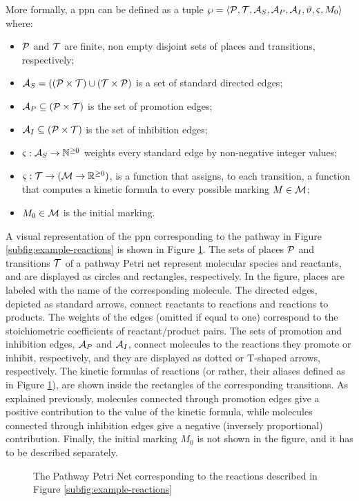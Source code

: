 More formally, a \gls{ppn} can be defined as a tuple $\wp = \Tuple{\Cal{P},\Cal{T},\Cal{A}_{S}, \Cal{A}_{P},\Cal{A}_{I},\vartheta,\varsigma,M_0}$ where:
\begin{itemize}
    \item $\Cal{P}$ and $\Cal{T}$ are finite, non empty disjoint sets of places and transitions, respectively;
    \item $\Cal{A}_{S} = ((\Cal{P}\times \Cal{T}) \cup (\Cal{T}\times \Cal{P})$ is a set of standard directed edges;
    \item $\Cal{A}_{P} \subseteq (\Cal{P} \times \Cal{T})$ is the set of promotion edges;
    \item $\Cal{A}_{I} \subseteq (\Cal{P} \times \Cal{T})$ is the set of inhibition edges;
    \item $\varsigma: \Cal{A}_{S} \shortrightarrow \mathbb{N}^{\geq 0}$ weights every standard edge by non-negative integer values;
    \item $\varsigma:\Cal{T} \shortrightarrow (\Cal{M} \rightarrow \mathbb{R}^{\geq 0})$,  is a function that assigns, to each transition, a function that computes a kinetic formula to every possible marking $M \in \Cal{M}$;
    \item $M_0 \in \Cal{M}$ is the initial marking.
\end{itemize}
A visual representation of the \gls{ppn} corresponding to the pathway in Figure \ref{subfig:example-reactions} is shown in Figure \ref{subfig:pathway-petri-net}. The sets of places $\Cal{P}$ and transitions $\Cal{T}$ of a pathway Petri net represent molecular species and reactants, and are displayed as circles and rectangles, respectively. In the figure, places are labeled with the name of the corresponding molecule. The directed edges, depicted as standard arrows, connect reactants to reactions and reactions to products. The weights of the edges (omitted if equal to one) correspond to the stoichiometric coefficients of reactant/product pairs. The sets of promotion and inhibition edges, $\Cal{A}_{P}$ and $\Cal{A}_{I}$, connect molecules to the reactions they promote or inhibit, respectively, and they are displayed as dotted or T-shaped arrows, respectively. The kinetic formulas of reactions (or rather, their aliases defined as in Figure \ref{subfig:pathway-petri-net}), are shown inside the rectangles of the corresponding transitions. As explained previously, molecules connected through promotion edges give a positive contribution to the value of the kinetic formula, while molecules connected through inhibition edges give a negative (inversely proportional) contribution. Finally, the initial marking $M_0$ is not shown in the figure, and it has to be described separately.
\begin{figure}[h!]
    \centering
    \resizebox{.6\textwidth}{!}{}
    \caption{The Pathway Petri Net corresponding to the reactions described in Figure \ref{subfig:example-reactions}}
    \label{subfig:pathway-petri-net}
\end{figure}

